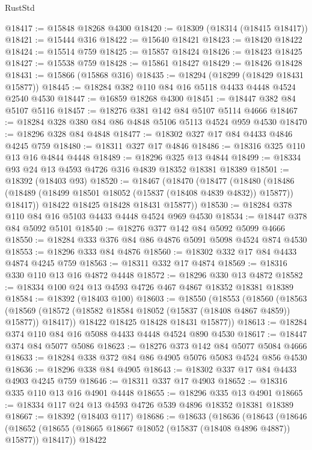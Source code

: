 \begin{lexlean}{RustStd}
\begin{coremodule}
{\begin{coremodule}
{{{{{{{{{{{{{{{{{{{{{{{{{{{{{{{{{{{{{{{{{{{{{{{{{{{{{{{{{{{{@18417 := @15848 @18268 @4300
@18420 := @18309 (@18314 (@18415 @18417))
@18421 := @15444 @316
@18422 := @15640 @18421
@18423 := @18420 @18422
@18424 := @15514 @759
@18425 := @15857 @18424
@18426 := @18423 @18425
@18427 := @15538 @759
@18428 := @15861 @18427
@18429 := @18426 @18428
@18431 := @15866 (@15868 @316)
@18435 := @18294 (@18299 (@18429 @18431 @15877))
@18445 := @18284 @382 @110 @84 @16 @5118 @4433 @4448 @4524 @2540 @4530
@18447 := @16859 @18268 @4300
@18451 := @18447 @382 @84 @5107 @5116
@18457 := @18276 @381 @142 @84 @5107 @5114 @4666
@18467 := @18284 @328 @380 @84 @86 @4848 @5106 @5113 @4524 @959 @4530
@18470 := @18296 @328 @84 @4848
@18477 := @18302 @327 @17 @84 @4433 @4846 @4245 @759
@18480 := @18311 @327 @17 @4846
@18486 := @18316 @325 @110 @13 @16 @4844 @4448
@18489 := @18296 @325 @13 @4844
@18499 := @18334 @93 @24 @13 @4593 @4726 @316 @4839 @18352 @18381 @18389
@18501 := @18392 (@18403 @93)
@18520 := @18467
    (@18470
      (@18477
        (@18480
          (@18486 (@18489 (@18499 @18501 @18052 (@15837 (@18408 @4839 @4832)) @15877)) @18417))
        @18422
        @18425
        @18428
        @18431
        @15877))
@18530 := @18284 @378 @110 @84 @16 @5103 @4433 @4448 @4524 @969 @4530
@18534 := @18447 @378 @84 @5092 @5101
@18540 := @18276 @377 @142 @84 @5092 @5099 @4666
@18550 := @18284 @333 @376 @84 @86 @4876 @5091 @5098 @4524 @874 @4530
@18553 := @18296 @333 @84 @4876
@18560 := @18302 @332 @17 @84 @4433 @4874 @4245 @759
@18563 := @18311 @332 @17 @4874
@18569 := @18316 @330 @110 @13 @16 @4872 @4448
@18572 := @18296 @330 @13 @4872
@18582 := @18334 @100 @24 @13 @4593 @4726 @467 @4867 @18352 @18381 @18389
@18584 := @18392 (@18403 @100)
@18603 := @18550
    (@18553
      (@18560
        (@18563
          (@18569 (@18572 (@18582 @18584 @18052 (@15837 (@18408 @4867 @4859)) @15877)) @18417))
        @18422
        @18425
        @18428
        @18431
        @15877))
@18613 := @18284 @374 @110 @84 @16 @5088 @4433 @4448 @4524 @890 @4530
@18617 := @18447 @374 @84 @5077 @5086
@18623 := @18276 @373 @142 @84 @5077 @5084 @4666
@18633 := @18284 @338 @372 @84 @86 @4905 @5076 @5083 @4524 @856 @4530
@18636 := @18296 @338 @84 @4905
@18643 := @18302 @337 @17 @84 @4433 @4903 @4245 @759
@18646 := @18311 @337 @17 @4903
@18652 := @18316 @335 @110 @13 @16 @4901 @4448
@18655 := @18296 @335 @13 @4901
@18665 := @18334 @117 @24 @13 @4593 @4726 @539 @4896 @18352 @18381 @18389
@18667 := @18392 (@18403 @117)
@18686 := @18633
    (@18636
      (@18643
        (@18646
          (@18652 (@18655 (@18665 @18667 @18052 (@15837 (@18408 @4896 @4887)) @15877)) @18417))
        @18422
}}}}}}}}}}}}}}}}}}}}}}}}}}}}}}}}}}}}}}}}}}}}}}}}}}}}}}}}}}}}
\end{coremodule}}
\end{coremodule}
\end{lexlean}
